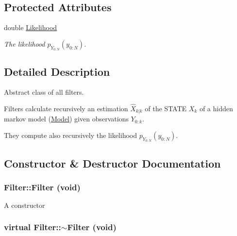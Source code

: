 \subsection*{Protected Attributes}
\begin{CompactItemize}
\item 
double \hyperlink{class_filter_5d4fd0aac4fddb732fc42e680fab5a1f}{Likelihood}
\begin{CompactList}\small\item\em The likelihood $ p_{Y_{0:N}}(y_{0:N}) $. \item\end{CompactList}\end{CompactItemize}


\subsection{Detailed Description}
Abstract class of all filters. 

Filters calculate recursively an estimation $ \hat{X}_{k|k} $ of the STATE $ X_{k} $ of a hidden markov model (\hyperlink{class_model}{Model}) given observations $ Y_{0:k} $. \begin{Desc}
\item[]\end{Desc}
They compute also recursively the likelihood $ p_{Y_{0:N}}(y_{0:N}) $. 

\subsection{Constructor \& Destructor Documentation}
\hypertarget{class_filter_b86c90163e27f662edd126f5ae0d0334}{
\subsubsection[{Filter}]{\setlength{\rightskip}{0pt plus 5cm}Filter::Filter (void)}}
\label{class_filter_b86c90163e27f662edd126f5ae0d0334}


A constructor \hypertarget{class_filter_f8a7766f99dd11bc8d02033e7be95c38}{
\subsubsection[{$\sim$Filter}]{\setlength{\rightskip}{0pt plus 5cm}virtual Filter::$\sim$Filter (void)}}
\label{class_filter_f8a7766f99dd11bc8d02033e7be95c38}


